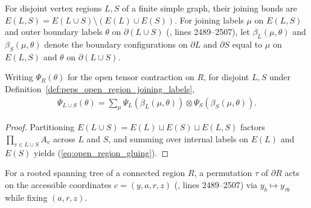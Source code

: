 \begin{definition}
    \label{def:peps_open_region_joining_labels}
    \leanok
    For disjoint vertex regions $L,S$ of a finite simple graph, their joining bonds are $E(L,S)=E(L\cup S)\setminus(E(L)\cup E(S))$.
    For joining labels $\mu$ on $E(L,S)$ and outer boundary labels $\theta$ on $\partial(L\cup S)$ (\cite{Schuch2010PEPS}, lines 2489--2507), let $\beta_L(\mu,\theta)$ and $\beta_S(\mu,\theta)$ denote the boundary configurations on $\partial L$ and $\partial S$ equal to $\mu$ on $E(L,S)$ and $\theta$ on $\partial(L\cup S)$.
\end{definition}

\begin{lemma}
    \label{thm:peps_graph_open_region_gluing}
    \leanok
    Writing $\Psi_R(\theta)$ for the open tensor contraction on $R$, for disjoint $L,S$ under Definition~\ref{def:peps_open_region_joining_labels},
    \begin{align}
        \Psi_{L\cup S}(\theta)
        =\sum_\mu \Psi_L(\beta_L(\mu,\theta))
        \otimes\Psi_S(\beta_S(\mu,\theta)). \label{eq:open_region_gluing}
    \end{align}
\end{lemma}
\begin{proof}\leanok
    Partitioning $E(L\cup S)=E(L)\sqcup E(S)\sqcup E(L,S)$ factors $\prod_{v\in L\cup S}A_v$ across $L$ and $S$, and summing over internal labels on $E(L)$ and $E(S)$ yields (\ref{eq:open_region_gluing}).
\end{proof}

\begin{definition}
    \label{def:peps_boundary_register_permutation}
    \leanok
    For a rooted spanning tree of a connected region $R$, a permutation $\tau$ of $\partial R$ acts on the accessible coordinates $c=(y,a,r,z)$ (\cite{Schuch2010PEPS}, lines 2489--2507) via $y_b\mapsto y_{\tau b}$ while fixing $(a,r,z)$.
\end{definition}

